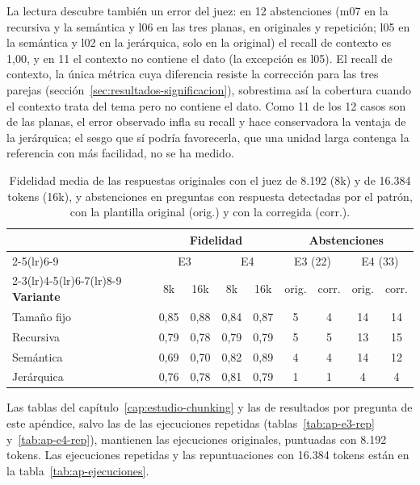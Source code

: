 La lectura descubre también un error del juez: en 12 abstenciones (m07 en la recursiva y la semántica y l06 en las tres planas, en originales y repetición; l05 en la semántica y l02 en la jerárquica, solo en la original) el recall de contexto es 1,00, y en 11 el contexto no contiene el dato (la excepción es l05). El recall de contexto, la única métrica cuya diferencia resiste la corrección para las tres parejas (sección~\ref{sec:resultados-significacion}), sobrestima así la cobertura cuando el contexto trata del tema pero no contiene el dato. Como 11 de los 12 casos son de las planas, el error observado infla su recall y hace conservadora la ventaja de la jerárquica; el sesgo que sí podría favorecerla, que una unidad larga contenga la referencia con más facilidad, no se ha medido.

\begin{table}[htbp]
\centering\small
\caption[Comprobaciones posteriores: juez y plantilla]{Fidelidad media de las respuestas originales con el juez de 8.192 (8k) y de 16.384 tokens (16k), y abstenciones en preguntas con respuesta detectadas por el patrón, con la plantilla original (orig.) y con la corregida (corr.).}
\label{tab:comprobaciones}
\setlength{\tabcolsep}{6pt}
\begin{tabular}{@{}l cc cc cc cc@{}}
\toprule
& \multicolumn{4}{c}{\textbf{Fidelidad}} & \multicolumn{4}{c}{\textbf{Abstenciones}} \\
\cmidrule(lr){2-5}\cmidrule(lr){6-9}
& \multicolumn{2}{c}{E3} & \multicolumn{2}{c}{E4} & \multicolumn{2}{c}{E3 (22)} & \multicolumn{2}{c}{E4 (33)} \\
\cmidrule(lr){2-3}\cmidrule(lr){4-5}\cmidrule(lr){6-7}\cmidrule(lr){8-9}
\textbf{Variante} & 8k & 16k & 8k & 16k & orig. & corr. & orig. & corr. \\
\midrule
Tamaño fijo & 0,85 & 0,88 & 0,84 & 0,87 & 5 & 4 & 14 & 14 \\
Recursiva   & 0,79 & 0,78 & 0,79 & 0,79 & 5 & 5 & 13 & 15 \\
Semántica   & 0,69 & 0,70 & 0,82 & 0,89 & 4 & 4 & 14 & 12 \\
Jerárquica  & 0,76 & 0,78 & 0,81 & 0,79 & 1 & 1 & 4 & 4 \\
\bottomrule
\end{tabular}
\end{table}

Las tablas del capítulo~\ref{cap:estudio-chunking} y las de resultados por pregunta de este apéndice, salvo las de las ejecuciones repetidas (tablas~\ref{tab:ap-e3-rep} y~\ref{tab:ap-e4-rep}), mantienen las ejecuciones originales, puntuadas con 8.192 tokens. Las ejecuciones repetidas y las repuntuaciones con 16.384 tokens están en la tabla~\ref{tab:ap-ejecuciones}.

